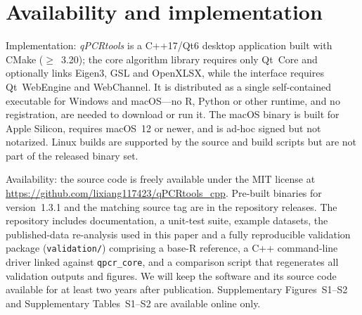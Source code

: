 \section{Availability and implementation}

Implementation: \textit{qPCRtools} is a C++17/Qt6 desktop application built
with CMake ($\geq$~3.20); the core algorithm library requires only Qt~Core and
optionally links Eigen3, GSL and OpenXLSX, while the interface requires
Qt~WebEngine and WebChannel. It is distributed as a single self-contained
executable for Windows and macOS---no R, Python or other runtime, and no
registration, are needed to download or run it. The macOS binary is built for
Apple Silicon, requires macOS~12 or newer, and is ad-hoc signed but not
notarized. Linux builds are supported by the source and build scripts but are
not part of the released binary set.

Availability: the source code is freely available under the MIT license at
\url{https://github.com/lixiang117423/qPCRtools_cpp}. Pre-built binaries for
version~1.3.1 and the matching source tag are in the repository releases. The
repository includes documentation, a unit-test suite, example datasets, the
published-data re-analysis used in this paper and a fully reproducible
validation package (\texttt{validation/}) comprising a base-R reference, a C++
command-line driver linked against \texttt{qpcr\_core}, and a comparison
script that regenerates all validation outputs and figures. We will keep the
software and its source code available for at least two years after
publication. Supplementary Figures~S1--S2 and Supplementary Tables~S1--S2
are available online only.
